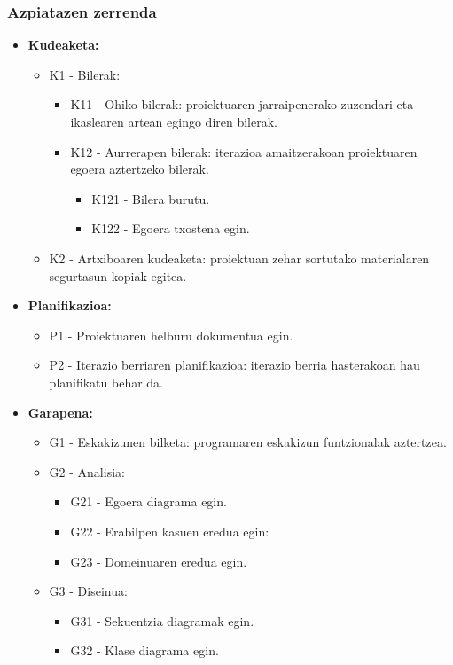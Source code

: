 \subsubsection{Azpiatazen zerrenda}
\begin{itemize}
\item \textbf{Kudeaketa:}
	\begin{itemize}
	\item K1 - Bilerak:
		\begin{itemize}
		\item K11 - Ohiko bilerak: proiektuaren jarraipenerako zuzendari eta ikaslearen artean egingo diren bilerak.
		\item K12 - Aurrerapen bilerak: iterazioa amaitzerakoan proiektuaren egoera aztertzeko bilerak.
			\begin{itemize}
			\item K121 - Bilera burutu.
			\item K122 - Egoera txostena egin.
			\end{itemize} 
		\end{itemize}
	\item K2 - Artxiboaren kudeaketa: proiektuan zehar sortutako materialaren segurtasun kopiak egitea.
	\end{itemize}
\item \textbf{Planifikazioa:}
	\begin{itemize}
	\item P1 - Proiektuaren helburu dokumentua egin.
	\item P2 - Iterazio berriaren planifikazioa: iterazio berria hasterakoan hau planifikatu behar da.
	\end{itemize}
\item \textbf{Garapena:}
	\begin{itemize}
	\item G1 - Eskakizunen bilketa: programaren eskakizun funtzionalak aztertzea.
	\item G2 - Analisia:
		\begin{itemize}
		\item G21 - Egoera diagrama egin.
		\item G22 - Erabilpen kasuen eredua egin: 
		\item G23 - Domeinuaren eredua egin.
		\end{itemize}
	\item G3 - Diseinua:
		\begin{itemize}
		\item G31 - Sekuentzia diagramak egin.
		\item G32 - Klase diagrama egin.

\end{itemize}
\end{itemize}
\end{itemize}
